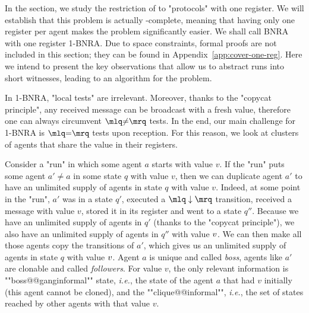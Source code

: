 	In the section, we study the restriction of \COVER to "protocols" with one register. We will establish that this problem is actually \NP-complete, meaning that having only one register per agent makes the problem significantly easier. 
	We shall call BNRA with one register 1-BNRA. Due to space constraints, formal proofs are not included in this section; they can be found in Appendix~\ref{app:cover-one-reg}. Here we intend to present the key observations that allow us to abstract runs into short witnesses, leading to an \NP algorithm for the problem.
	
	In 1-BNRA, "local tests" are irrelevant. Moreover, thanks to the "copycat principle", any received message can be broadcast with a fresh value, therefore one can always circumvent $\quotemarks{\diseqtestact}$ tests. In the end, our main challenge for 1-BNRA is $\quotemarks{\eqtestact}$ tests upon reception.
	For this reason, we look at clusters of agents that share the value in their registers. 

	Consider a "run" in which some agent $a$ starts with value $v$. If the "run" puts some agent $a' \ne a$ in some state $q$ with value $v$, then we can duplicate agent $a'$ to have an unlimited supply of agents in state $q$ with value $v$. Indeed, at some point in the "run", $a'$ was in a state $q'$, executed a $\quotemarks{\enregact}$ transition, received a message with value $v$, stored it in its register and went to a state $q''$. Because we have an unlimited supply of agents in $q'$ (thanks to the "copycat principle"), we also have an unlimited supply of agents in $q''$ with value $v$. We can then make all those agents copy the transitions of $a'$, which gives us an unlimited supply of agents in state $q$ with value $v$. Agent $a$ is unique and called \emph{boss}, agents like $a'$ are clonable and called \emph{followers}. For value $v$, the only relevant information is ""boss@@ganginformal"" state, \emph{i.e.}, the state of the agent $a$ that had $v$ initially (this agent cannot be cloned), and the ""clique@@informal"", \emph{i.e.}, the set of states reached by other agents with that value $v$. 

